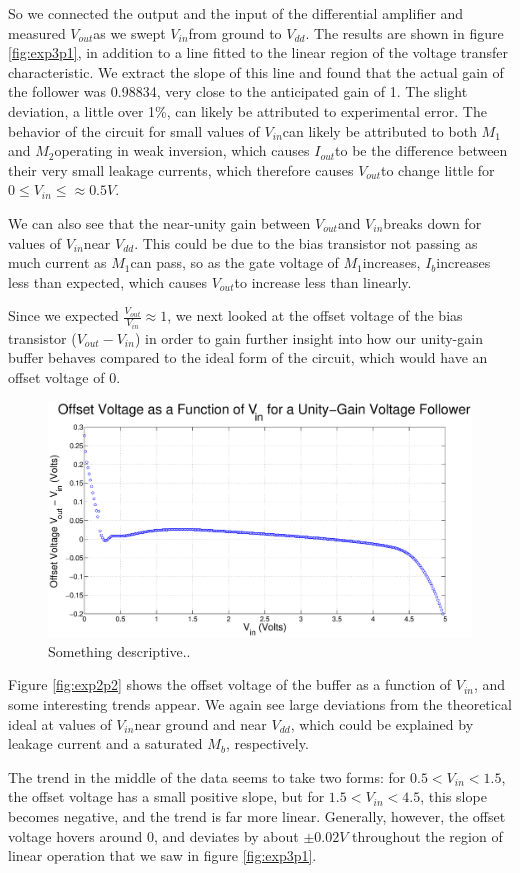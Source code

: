 \documentclass{article}
\newcommand{\Vout}{{$V_{out}$}}
\newcommand{\Vdd}{{$V_{dd}$}}
\newcommand{\Iout}{{$I_{out}$}}
\newcommand{\Vin}{{$V_{in}$}}
\newcommand{\Ib}{{$I_{b}$}}
\newcommand{\Mone}{{$M_{1}$}}
\newcommand{\Mtwo}{{$M_{2}$}}
\newcommand{\Mb}{{$M_{b}$}}
\begin{document}
So we connected the output and the input of the differential amplifier and measured \Vout as we swept \Vin from ground to \Vdd. The results are shown in figure \ref{fig:exp3p1}, in addition to a line fitted to the linear region of the voltage transfer characteristic. We extract the slope of this line and found that the actual gain of the follower was 0.98834, very close to the anticipated gain of 1. The slight deviation, a little over 1\%, can likely be attributed to experimental error. The behavior of the circuit for small values of \Vin can likely be attributed to both \Mone and \Mtwo operating in weak inversion, which causes \Iout to be the difference between their very small leakage currents, which therefore causes \Vout to change little for $0 \leq V_{in} \leq \approx 0.5 V.$

We can also see that the near-unity gain between \Vout and \Vin breaks down for values of \Vin near \Vdd. This could be due to the bias transistor not passing as much current as \Mone can pass, so as the gate voltage of \Mone increases, \Ib increases less than expected, which causes \Vout to increase less than linearly.

Since we expected $\frac{V_{out}}{V_{in}} \approx 1$, we next looked at the offset voltage of the bias transistor ($V_{out} - V_{in}$) in order to gain further insight into how our unity-gain buffer behaves compared to the ideal form of the circuit, which would have an offset voltage of 0.

\begin{figure}[H]
\centering
\includegraphics[width=\linewidth]{../Figures/Exp3P2.eps}
\caption{Something descriptive..}
\label{fig:exp3p2}
\end{figure}

Figure \ref{fig:exp2p2} shows the offset voltage of the buffer as a function of \Vin, and some interesting trends appear. We again see large deviations from the theoretical ideal at values of \Vin near ground and near \Vdd, which could be explained by leakage current and a saturated \Mb, respectively.

The trend in the middle of the data seems to take two forms: for $0.5 < V_{in} < 1.5$, the offset voltage has a small positive slope, but for $1.5 < V_{in} < 4.5$, this slope becomes negative, and the trend is far more linear. Generally, however, the offset voltage hovers around 0, and deviates by about $\pm 0.02 V$ throughout the region of linear operation that we saw in figure \ref{fig:exp3p1}. 
\end{document}
